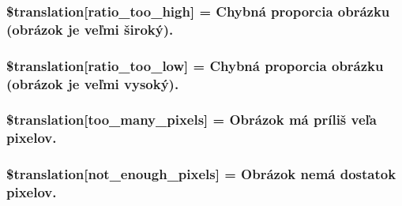 \subsubsection[{\$translation}]{\setlength{\rightskip}{0pt plus 5cm}\$translation\mbox{[}\textquotesingle{}ratio\+\_\+too\+\_\+high\textquotesingle{}\mbox{]} = \textquotesingle{}Chybná proporcia obrázku (obrázok je veľmi široký).\textquotesingle{}}\label{class_8upload_8sk___s_k_8php_a23396f6ce7f31e5e5f1b57580621d982}
\hypertarget{class_8upload_8sk___s_k_8php_ac533b9a479f056b0b8623e4268f068c2}{}
\subsubsection[{\$translation}]{\setlength{\rightskip}{0pt plus 5cm}\$translation\mbox{[}\textquotesingle{}ratio\+\_\+too\+\_\+low\textquotesingle{}\mbox{]} = \textquotesingle{}Chybná proporcia obrázku (obrázok je veľmi vysoký).\textquotesingle{}}\label{class_8upload_8sk___s_k_8php_ac533b9a479f056b0b8623e4268f068c2}
\hypertarget{class_8upload_8sk___s_k_8php_aa4051ef64e94a3f8295c63cf85544016}{}
\subsubsection[{\$translation}]{\setlength{\rightskip}{0pt plus 5cm}\$translation\mbox{[}\textquotesingle{}too\+\_\+many\+\_\+pixels\textquotesingle{}\mbox{]} = \textquotesingle{}Obrázok má príliš veľa pixelov.\textquotesingle{}}\label{class_8upload_8sk___s_k_8php_aa4051ef64e94a3f8295c63cf85544016}
\hypertarget{class_8upload_8sk___s_k_8php_a1fe342c27ce61f4ff4e0120ba647033e}{}
\subsubsection[{\$translation}]{\setlength{\rightskip}{0pt plus 5cm}\$translation\mbox{[}\textquotesingle{}not\+\_\+enough\+\_\+pixels\textquotesingle{}\mbox{]} = \textquotesingle{}Obrázok nemá dostatok pixelov.\textquotesingle{}}\label{class_8upload_8sk___s_k_8php_a1fe342c27ce61f4ff4e0120ba647033e}
\hypertarget{class_8upload_8sk___s_k_8php_a4ce76e7be0b3a03c2b47f6d70c21832e}{}
